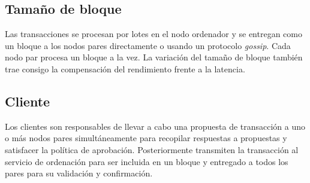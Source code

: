 \subsection{Tama\~no de bloque}
Las transacciones se procesan por lotes en el nodo ordenador y se entregan como un bloque a los nodos pares directamente o usando un protocolo \emph{gossip}. Cada nodo par procesa un bloque a la vez. La variaci\'on del tama\~no de bloque tambi\'en trae consigo la compensaci\'on del rendimiento frente a la latencia.

\subsection{Cliente}
Los clientes son responsables de llevar a cabo una propuesta de transacci\'on a uno o m\'as nodos pares simult\'aneamente para recopilar respuestas a propuestas y satisfacer la pol\'itica de aprobaci\'on. Posteriormente transmiten la transacci\'on al servicio de ordenaci\'on para ser incluida en un bloque y entregado a todos los pares para su validaci\'on y confirmaci\'on.

